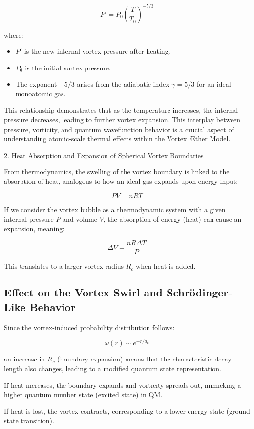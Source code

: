 \documentclass[a4paper,10pt]{article}
\begin{document}
\[P' = P_0 \left( \frac{T}{T_0} \right)^{-5/3}\]

where:

\begin{itemize}
\item \(P'\) is the new internal vortex pressure after heating.
\item \(P_0\) is the initial vortex pressure.
\item The exponent \(-5/3\) arises from the adiabatic index \(\gamma = 5/3\) for an ideal monoatomic gas.
\end{itemize}

This relationship demonstrates that as the temperature increases, the internal pressure decreases, leading to further vortex expansion. This interplay between pressure, vorticity, and quantum wavefunction behavior is a crucial aspect of understanding atomic-scale thermal effects within the Vortex Æther Model.


2. Heat Absorption and Expansion of Spherical Vortex Boundaries

From thermodynamics, the swelling of the vortex boundary is linked to the absorption of heat, analogous to how an ideal gas expands upon energy input:

\[ PV = nRT \]

If we consider the vortex bubble as a thermodynamic system with a given internal pressure \( P \) and volume \( V \), the absorption of energy (heat) can cause an expansion, meaning:

\[ \Delta V = \frac{nR\Delta T}{P} \]

This translates to a larger vortex radius \( R_c \) when heat is added.

\subsection*{Effect on the Vortex Swirl and Schrödinger-Like Behavior}

Since the vortex-induced probability distribution follows:

\[ \omega(r) \sim e^{-r/a_0} \]

an increase in \( R_c \) (boundary expansion) means that the characteristic decay length also changes, leading to a modified quantum state representation.

If heat increases, the boundary expands and vorticity spreads out, mimicking a higher quantum number state (excited state) in QM.

If heat is lost, the vortex contracts, corresponding to a lower energy state (ground state transition).
\end{document}
